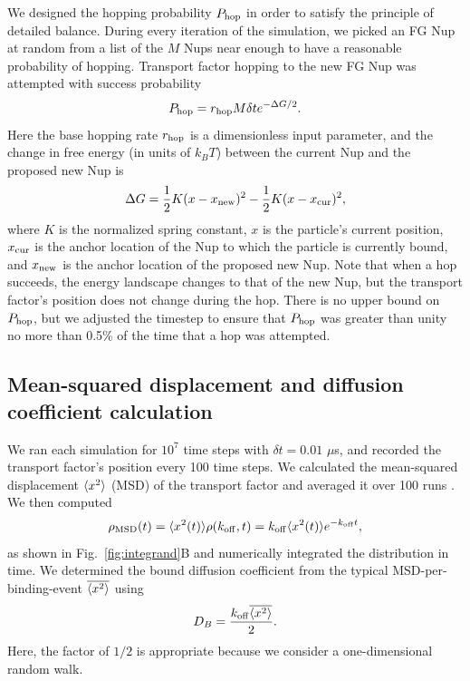 We designed the hopping probability $P_{\rm hop}$ in order to satisfy the principle of detailed balance.  During every iteration of the simulation, we picked an FG Nup at random from a list of the $M$  Nups near enough to have a reasonable probability of hopping. Transport factor hopping to the new FG Nup was attempted with success probability
\begin{equation}
P_{\rm hop} = r_{\mathrm{hop}} M \delta t e^{-\Delta G /2}.
\end{equation}
Here the base hopping rate $r_{\mathrm{hop}}$ is a dimensionless input parameter, and the change in free energy (in units of $k_BT$) between the current Nup and the proposed new Nup is
\begin{equation}
  \Delta G = \frac{1}{2} K (x-x_{\mathrm{new}})^2 - \frac{1}{2} K (x -
  x_{\mathrm{cur}})^2,
\end{equation}
where $K$ is the normalized spring constant, $x$ is the particle's current position, $x_{\mathrm{cur}}$ is the anchor location of the Nup to which the particle is currently bound, and $x_{\mathrm{new}}$ is the anchor location of the proposed new Nup. Note that when a hop succeeds, the energy landscape changes to that of the new Nup, but the transport factor's position does not change during the hop.  There is no upper bound on $P_{\rm hop}$, but we adjusted the timestep to ensure that $P_{\rm hop}$ was greater than
unity no more than 0.5\% of the time that a hop was attempted.

\subsection{Mean-squared displacement and diffusion coefficient calculation}
We ran each simulation for $10^7$ time steps with $\delta t = 0.01$ $\mu$s, and recorded the transport factor's position every 100 time steps.  We calculated the mean-squared displacement $\langle x^2 \rangle$ (MSD) of the transport factor and averaged it over 100 runs .  We then computed
\begin{equation}
\rho_{\mathrm{MSD}} (t)= \langle x^2(t) \rangle \rho(k_{\rm off},t) = k_{\rm off} \langle x^2(t) \rangle
e^{-k_{\rm off} t}, 
\end{equation}
as shown in Fig.~\ref{fig:integrand}B and numerically integrated the distribution in time. We determined the bound diffusion coefficient from the typical MSD-per-binding-event $\overline{\langle x^2 \rangle}$ using
\begin{equation}
D_B = \frac{k_{\rm off} \overline{\langle x^2 \rangle}}{2}. 
\end{equation}   
Here, the factor of $1/2$ is appropriate because we consider a one-dimensional random walk.

